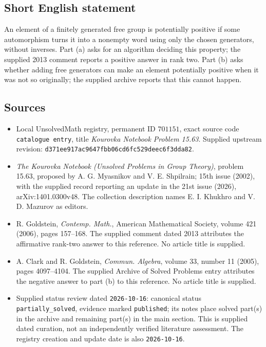 \documentclass[11pt]{article}
\begin{document}
\subsection{Short English statement}
An element of a finitely generated free group is potentially positive if some automorphism turns it into a nonempty word using only the chosen generators, without inverses. Part (a) asks for an algorithm deciding this property; the supplied 2013 comment reports a positive answer in rank two. Part (b) asks whether adding free generators can make an element potentially positive when it was not so originally; the supplied archive reports that this cannot happen.
\subsection{Sources}
\begin{itemize}
\item Local UnsolvedMath registry, permanent ID \(701151\), exact source code \texttt{catalogue entry}, title \emph{Kourovka Notebook Problem 15.63}. Supplied upstream revision: \texttt{d371ee917ac9647fbb06cd6fc529deec6f3dda82}.
\item \emph{The Kourovka Notebook (Unsolved Problems in Group Theory)}, problem 15.63, proposed by A. G. Myasnikov and V. E. Shpilrain; 15th issue (2002), with the supplied record reporting an update in the 21st issue (2026), arXiv:1401.0300v48. The collection description names E. I. Khukhro and V. D. Mazurov as editors.
\item R. Goldstein, \emph{Contemp. Math.}, American Mathematical Society, volume 421 (2006), pages 157--168. The supplied comment dated 2013 attributes the affirmative rank-two answer to this reference. No article title is supplied.
\item A. Clark and R. Goldstein, \emph{Commun. Algebra}, volume 33, number 11 (2005), pages 4097--4104. The supplied Archive of Solved Problems entry attributes the negative answer to part (b) to this reference. No article title is supplied.
\item Supplied status review dated \texttt{2026-10-16}: canonical status \texttt{partially\_solved}, evidence marked \texttt{published}; its notes place solved part(s) in the archive and remaining part(s) in the main section. This is supplied dated curation, not an independently verified literature assessment. The registry creation and update date is also \texttt{2026-10-16}.
\end{itemize}
\end{document}
